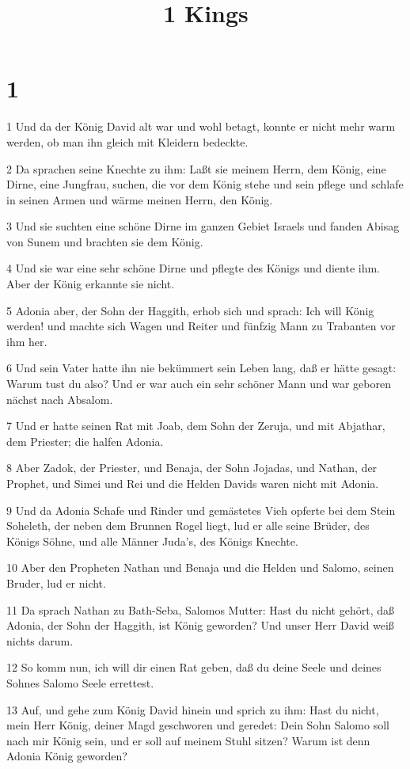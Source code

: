 

\title{1 Kings}


\chapter{1}

\par 1 Und da der König David alt war und wohl betagt, konnte er nicht mehr warm werden, ob man ihn gleich mit Kleidern bedeckte.
\par 2 Da sprachen seine Knechte zu ihm: Laßt sie meinem Herrn, dem König, eine Dirne, eine Jungfrau, suchen, die vor dem König stehe und sein pflege und schlafe in seinen Armen und wärme meinen Herrn, den König.
\par 3 Und sie suchten eine schöne Dirne im ganzen Gebiet Israels und fanden Abisag von Sunem und brachten sie dem König.
\par 4 Und sie war eine sehr schöne Dirne und pflegte des Königs und diente ihm. Aber der König erkannte sie nicht.
\par 5 Adonia aber, der Sohn der Haggith, erhob sich und sprach: Ich will König werden! und machte sich Wagen und Reiter und fünfzig Mann zu Trabanten vor ihm her.
\par 6 Und sein Vater hatte ihn nie bekümmert sein Leben lang, daß er hätte gesagt: Warum tust du also? Und er war auch ein sehr schöner Mann und war geboren nächst nach Absalom.
\par 7 Und er hatte seinen Rat mit Joab, dem Sohn der Zeruja, und mit Abjathar, dem Priester; die halfen Adonia.
\par 8 Aber Zadok, der Priester, und Benaja, der Sohn Jojadas, und Nathan, der Prophet, und Simei und Rei und die Helden Davids waren nicht mit Adonia.
\par 9 Und da Adonia Schafe und Rinder und gemästetes Vieh opferte bei dem Stein Soheleth, der neben dem Brunnen Rogel liegt, lud er alle seine Brüder, des Königs Söhne, und alle Männer Juda's, des Königs Knechte.
\par 10 Aber den Propheten Nathan und Benaja und die Helden und Salomo, seinen Bruder, lud er nicht.
\par 11 Da sprach Nathan zu Bath-Seba, Salomos Mutter: Hast du nicht gehört, daß Adonia, der Sohn der Haggith, ist König geworden? Und unser Herr David weiß nichts darum.
\par 12 So komm nun, ich will dir einen Rat geben, daß du deine Seele und deines Sohnes Salomo Seele errettest.
\par 13 Auf, und gehe zum König David hinein und sprich zu ihm: Hast du nicht, mein Herr König, deiner Magd geschworen und geredet: Dein Sohn Salomo soll nach mir König sein, und er soll auf meinem Stuhl sitzen? Warum ist denn Adonia König geworden?
